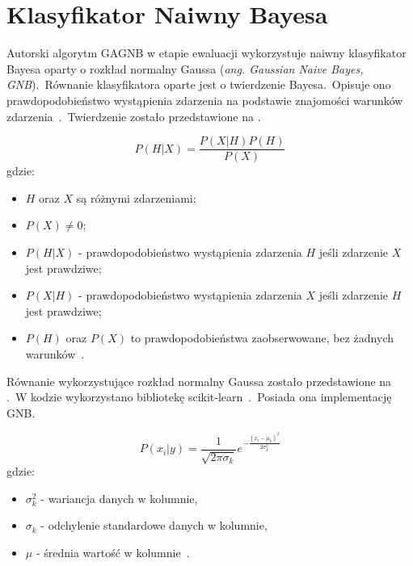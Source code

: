 \section{Klasyfikator Naiwny Bayesa}
Autorski algorytm GAGNB w etapie ewaluacji wykorzystuje naiwny klasyfikator Bayesa oparty o rozkład normalny Gaussa (\textit{ang. Gaussian Naive Bayes, GNB}).\ Równanie klasyfikatora oparte jest o twierdzenie Bayesa.\ Opisuje ono prawdopodobieństwo wystąpienia zdarzenia na podstawie znajomości warunków zdarzenia~\cite{Joyce2003}.\ Twierdzenie zostało przedstawione na .

\begin{equation}\label{math:bayes}
P(H|X) = \frac{P(X|H) P(H)}{P(X)}
\end{equation}
gdzie:
\begin{itemize}
    \item $H$ oraz $X$ są różnymi zdarzeniami;
    \item $P(X) \neq 0$;
    \item $P(H|X)$ - prawdopodobieństwo wystąpienia zdarzenia $H$ jeśli zdarzenie $X$ jest prawdziwe;
    \item $P(X|H)$ - prawdopodobieństwo wystąpienia zdarzenia $X$ jeśli zdarzenie $H$ jest prawdziwe;
    \item $P(H)$ oraz $P(X)$ to prawdopodobieństwa zaobserwowane, bez żadnych warunków~\cite{Leung2007}.
\end{itemize}

Równanie wykorzystujące rozkład normalny Gaussa zostało przedstawione na .\ W kodzie wykorzystano bibliotekę scikit-learn~\cite{scikit-learn}.\ Posiada ona implementację GNB.

\begin{equation}\label{math:gnb}
    P(x_{i}|y) = \frac{1}{\sqrt{2\pi\sigma_{k}}}e^{-\frac{(x_{i}-\mu_{k})^2}{2\sigma_{k}^{2}}}
\end{equation}
gdzie:
\begin{itemize}
        \item[] \textbf{$\sigma_{k}^{2}$} - wariancja danych w kolumnie,
        \item[] \textbf{$\sigma_{k}$} - odchylenie standardowe danych w kolumnie,
        \item[] \textbf{$\mu$} - średnia wartość w kolumnie~\cite{Leung2007}.
\end{itemize}

